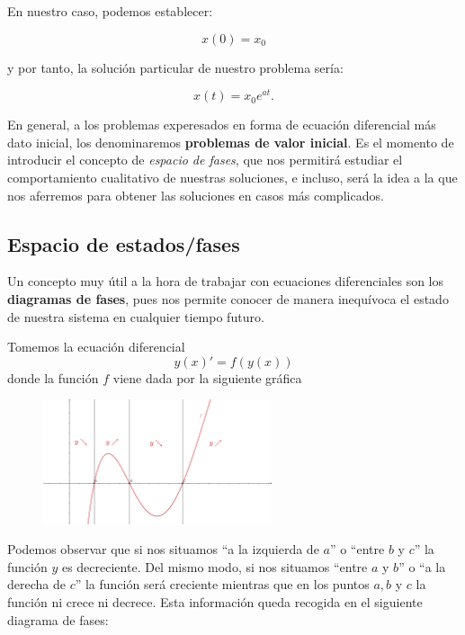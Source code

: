 En nuestro caso, podemos establecer:

\begin{equation}
x(0) = x_0
\end{equation}

y por tanto, la solución particular de nuestro problema sería:

\begin{equation}
x(t) = x_0e^{at}.
\end{equation}

En general, a los problemas experesados en forma de ecuación diferencial más dato inicial, los denominaremos \textbf{problemas de valor inicial}.\newline
Es el momento de introducir el concepto de \emph{espacio de fases}, que nos permitirá estudiar el comportamiento cualitativo de nuestras soluciones, e incluso, será la idea a la que nos aferremos para obtener las soluciones en casos más complicados.

\subsection{Espacio de estados/fases}

Un concepto muy útil a la hora de trabajar con ecuaciones diferenciales son los \textbf{diagramas de fases}, pues nos permite conocer de manera inequívoca el estado de nuestra sistema en cualquier tiempo futuro.

Tomemos la ecuación diferencial
\[y(x)'=f(y(x))\]
donde la función $f$ viene dada por la siguiente gráfica

\begin{figure}[hbtp]
\centering
\includegraphics[width = 0.6\textwidth]{img/propiedades-autonomas.png}
\end{figure}

Podemos observar que si nos situamos ``a la izquierda de $a$'' o ``entre $b$ y $c$'' la función $y$ es decreciente. Del mismo modo, si nos situamos ``entre $a$ y $b$'' o ``a la derecha de $c$'' la función será creciente mientras que en los puntos $a, b$ y $c$ la función ni crece ni decrece. Esta información queda recogida en el siguiente diagrama de fases:

